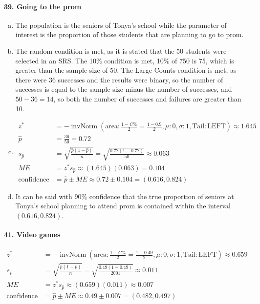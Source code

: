 \documentclass[12pt, A4]{article}
\DeclareMathOperator{\invNorm}{invNorm}
\newcommand{\invNormal}[4]{\invNorm\left(\mathrm{area}:#1, \mu: #2, \sigma: #3, \mathrm{Tail: #4}\right)}
\newcommand{\propse}[2]{\sqrt{\frac{#1\left(1 - #1\right)}{#2}}}
\begin{document}
		\paragraph{39. Going to the prom}
			\begin{enumerate}[a.]
				\item
					The population is the seniors of Tonya's school while the parameter of interest is the proportion of those students that are planning to go to prom.
				\item
					The random condition is met, as it is stated that the 50 students were selected in an SRS.
					 The 10\% condition is met, 10\% of 750 is 75, which is greater than the sample size of 50.
					The Large Counts condition is met, as there were 36 successes and the results were binary, so the number of successes is equal to the sample size minus the number of successes, and $50 - 36 = 14$, so both the number of successes and failures are greater than 10.
				\item
					\begin{align*}
						z^* &= -\invNormal{\frac{1 - C\%}{2} = \frac{1 - 0.9}{2}}{0}{1}{LEFT} \approx 1.645 \\
						\hat{p} &= \frac{36}{50} = 0.72 \\
						s_{\hat{p}} &= \propse{\hat{p}}{n} = \propse{0.72}{50} \approx 0.063\\
						ME &= z^*s_{\hat{p}} \approx (1.645)(0.063) = 0.104 \\
						\text{confidence interval} &= \hat{p} \pm ME \approx 0.72 \pm 0.104 = (0.616, 0.824)
					\end{align*}
				\item
					It can be said with 90\% confidence that the true proportion of seniors at Tonya's school planning to attend prom is contained within the interval $(0.616, 0.824)$.
			\end{enumerate}
		\paragraph{41. Video games}
			\begin{align*}
				z^* &= -\invNormal{\frac{1 - C\%}{2} = \frac{1 - 0.49}{2}}{0}{1}{LEFT} \approx 0.659 \\
				s_{\hat{p}} &= \propse{\hat{p}}{n} = \propse{0.49}{2001} \approx 0.011 \\
				ME &= z^*s_{\hat{p}} \approx (0.659)(0.011) \approx 0.007 \\
				\text{confidence interval} &= \hat{p} \pm ME \approx 0.49 \pm 0.007 = (0.482, 0.497)
			\end{align*}
\end{document}

